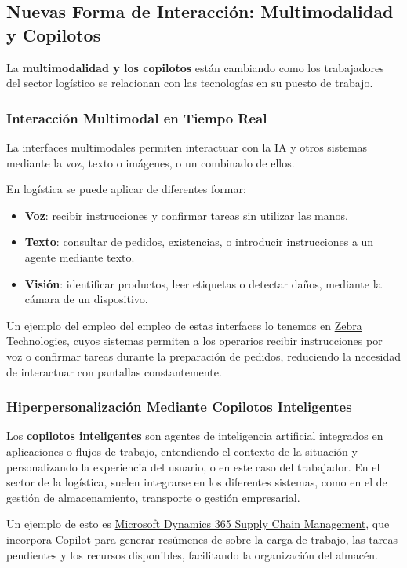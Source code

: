 \subsection{Nuevas Forma de Interacción: Multimodalidad y Copilotos}
La \textbf{multimodalidad y los copilotos} están cambiando como los trabajadores del sector logístico se relacionan con las tecnologías en su puesto de trabajo.

\subsubsection{Interacción Multimodal en Tiempo Real}
La interfaces multimodales permiten interactuar con la IA y otros sistemas mediante la voz, texto o imágenes, o un combinado de ellos. 

En logística se puede aplicar de diferentes formar:
\begin{itemize}
	\item \textbf{Voz}: recibir instrucciones y confirmar tareas sin utilizar las manos.
	\item \textbf{Texto}: consultar de pedidos, existencias, o introducir instrucciones a un agente mediante texto.
	\item \textbf{Visión}: identificar productos, leer etiquetas o detectar daños, mediante la cámara de un dispositivo.
\end{itemize}

Un ejemplo del empleo del empleo de estas interfaces lo tenemos en \href{https://www.zebra.com/us/en/resource-library/use-case-library/multimodal-directed-picking-for-warehouses.html?utm_source=chatgpt.com}{Zebra Technologies}, cuyos sistemas permiten a los operarios recibir instrucciones por voz o confirmar tareas durante la preparación de pedidos, reduciendo la necesidad de interactuar con pantallas constantemente.

\subsubsection{Hiperpersonalización Mediante Copilotos Inteligentes}
Los \textbf{copilotos inteligentes} son agentes de inteligencia artificial integrados en aplicaciones o flujos de trabajo, entendiendo el contexto de la situación y personalizando la experiencia del usuario, o en este caso del trabajador. En el sector de la logística, suelen integrarse en los diferentes sistemas, como en el de gestión de almacenamiento, transporte o gestión empresarial.

Un ejemplo de esto es \href{https://learn.microsoft.com/en-us/dynamics365/supply-chain/faq-wma-copilot?utm_source=chatgpt.com}{Microsoft Dynamics 365 Supply Chain Management}, que incorpora Copilot para generar resúmenes de sobre la carga de trabajo, las tareas pendientes y los recursos disponibles, facilitando la organización del almacén.

